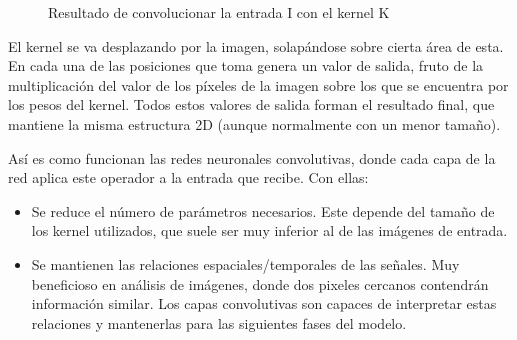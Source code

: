 \begin{figure}[H]
\centering
    \caption{Resultado de convolucionar la entrada I con el kernel K \cite{Goodfellow-et-al-2016}}
\end{figure}

El kernel se va desplazando por la imagen, solapándose sobre cierta área de esta. En cada una de las posiciones que toma genera un valor de salida, fruto de la multiplicación del valor de los píxeles de la imagen sobre los que se encuentra por los pesos del kernel. Todos estos valores de salida forman el resultado final, que mantiene la misma estructura 2D (aunque normalmente con un menor tamaño). 

Así es como funcionan las redes neuronales convolutivas, donde cada capa de la red aplica este operador a la entrada que recibe. Con ellas:
\begin{itemize}
    \item Se reduce el número de parámetros necesarios. Este depende del tamaño de los kernel utilizados, que suele ser muy inferior al de las imágenes de entrada.
    \item Se mantienen las relaciones espaciales/temporales de las señales. Muy beneficioso en análisis de imágenes, donde dos pixeles cercanos contendrán información similar. Los capas convolutivas son capaces de interpretar estas relaciones y mantenerlas para las siguientes fases del modelo. \cite{Goodfellow-et-al-2016}
\end{itemize}

